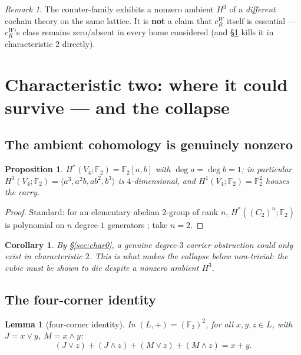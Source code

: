 \documentclass[11pt]{article}
\newtheorem{lemma}[theorem]{Lemma}
\newtheorem{proposition}[theorem]{Proposition}
\newtheorem{corollary}[theorem]{Corollary}
\theoremstyle{definition}
\theoremstyle{remark}
\newtheorem{remark}[theorem]{Remark}
\newcommand{\F}{\mathbb{F}}
\newcommand{\cR}{c_R^W}
\begin{document}
\begin{remark}
The counter-family exhibits a nonzero ambient $H^3$ of a \emph{different} cochain theory on the same lattice. It is \textbf{not} a claim that $\cR$ itself is essential --- $\cR$'s class remains zero/absent in every home considered (and \S\ref{sec:char2} kills it in characteristic $2$ directly).
\end{remark}

\section{Characteristic two: where it could survive --- and the collapse}\label{sec:char2}

\subsection{The ambient cohomology is genuinely nonzero}

\begin{proposition}\label{prop:ambient}
$H^*(V_4;\F_2)=\F_2[a,b]$ with $\deg a=\deg b=1$; in particular $H^3(V_4;\F_2)=\langle a^3,a^2b,ab^2,b^3\rangle$ is $4$-dimensional, and $H^1(V_4;\F_2)=\F_2^2$ houses the carry.
\end{proposition}

\begin{proof}
Standard: for an elementary abelian $2$-group of rank $n$, $H^*((C_2)^n;\F_2)$ is polynomial on $n$ degree-$1$ generators \cite[Ch.~II--III]{ademmilgram}; take $n=2$.
\end{proof}

\begin{corollary}
By \S\ref{sec:char0}, a genuine degree-$3$ carrier obstruction could only exist in characteristic $2$. This is what makes the collapse below non-trivial: the cubic must be shown to die \emph{despite} a nonzero ambient $H^3$.
\end{corollary}

\subsection{The four-corner identity}

\begin{lemma}[four-corner identity]\label{lem:fourcorner}
In $(L,+)=(\F_2)^2$, for all $x,y,z\in L$, with $J=x\vee y$, $M=x\wedge y$:
\[
(J\vee z)+(J\wedge z)+(M\vee z)+(M\wedge z)=x+y .
\]
\end{lemma}
\end{document}
